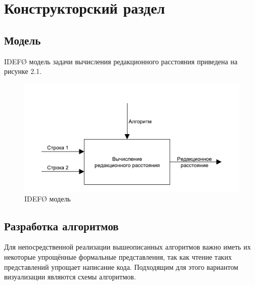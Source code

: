 \chapter{Конструкторский раздел}
\label{cha:design}

\section{Модель}
IDEF\O{} модель задачи вычисления редакционного расстояния приведена на рисунке 2.1.
\begin{figure}
    \centering
    \includegraphics{pdf/mainIdef0.pdf}
    \caption{IDEF\O{} модель}
\end{figure}

\section{Разработка алгоритмов}
Для непосредственной реализации вышеописанных алгоритмов важно иметь их некоторые упрощённые формальные представления, так как чтение таких представлений упрощает написание кода. Подходящим для этого вариантом визуализации являются схемы алгоритмов.

